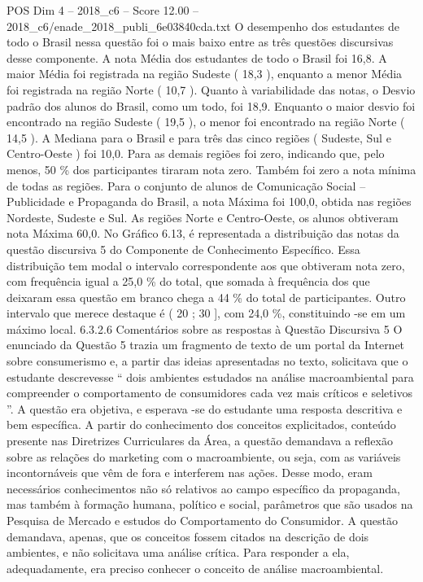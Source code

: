 \begin{textsample}{POS Dim 4 – 2018\_c6 – Score 12.00 – 2018\_c6/enade\_2018\_publi\_6e03840cda.txt}
O desempenho dos estudantes de todo o Brasil nessa questão foi o mais baixo entre as três questões discursivas desse componente.
A nota Média dos estudantes de todo o Brasil foi 16,8.
A maior Média foi registrada na região Sudeste ( 18,3 ), enquanto a menor Média foi registrada na região Norte ( 10,7 ).
Quanto à variabilidade das notas, o Desvio padrão dos alunos do Brasil, como um todo, foi 18,9.
Enquanto o maior desvio foi encontrado na região Sudeste ( 19,5 ), o menor foi encontrado na região Norte ( 14,5 ).
A Mediana para o Brasil e para três das cinco regiões ( Sudeste, Sul e Centro-Oeste ) foi 10,0.
Para as demais regiões foi zero, indicando que, pelo menos, 50 \% dos participantes tiraram nota zero.
Também foi zero a nota mínima de todas as regiões.
Para o conjunto de alunos de Comunicação Social – Publicidade e Propaganda do Brasil, a nota Máxima foi 100,0, obtida nas regiões Nordeste, Sudeste e Sul.
As regiões Norte e Centro-Oeste, os alunos obtiveram nota Máxima 60,0.
No Gráfico 6.13, é representada a distribuição das notas da questão discursiva 5 do Componente de Conhecimento Específico.
Essa distribuição tem modal o intervalo correspondente aos que obtiveram nota zero, com frequência igual a 25,0 \% do total, que somada à frequência dos que deixaram essa questão em branco chega a 44 \% do total de participantes.
Outro intervalo que merece destaque é ( 20 ; 30 ], com 24,0 \%, constituindo -se em um máximo local. 6.3.2.6 Comentários sobre as respostas à Questão Discursiva 5 O enunciado da Questão 5 trazia um fragmento de texto de um portal da Internet sobre consumerismo e, a partir das ideias apresentadas no texto, solicitava que o estudante descrevesse “ dois ambientes estudados na análise macroambiental para compreender o comportamento de consumidores cada vez mais críticos e seletivos ”.
A questão era objetiva, e esperava -se do estudante uma resposta descritiva e bem específica.
A partir do conhecimento dos conceitos explicitados, conteúdo presente nas Diretrizes Curriculares da Área, a questão demandava a reflexão sobre as relações do marketing com o macroambiente, ou seja, com as variáveis incontornáveis que vêm de fora e interferem nas ações.
Desse modo, eram necessários conhecimentos não só relativos ao campo específico da propaganda, mas também à formação humana, político e social, parâmetros que são usados na Pesquisa de Mercado e estudos do Comportamento do Consumidor.
A questão demandava, apenas, que os conceitos fossem citados na descrição de dois ambientes, e não solicitava uma análise crítica.
Para responder a ela, adequadamente, era preciso conhecer o conceito de análise macroambiental.

\end{textsample}
